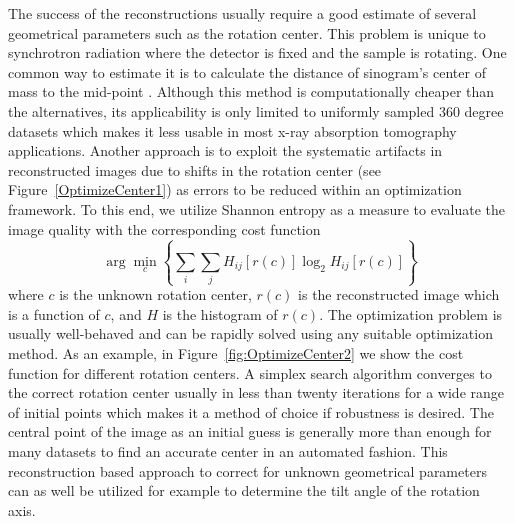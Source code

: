 \documentclass[pdf]{iucr}              %
\begin{document}
The success of the reconstructions usually require a good estimate of several geometrical parameters such as the rotation center. This problem is unique to synchrotron radiation where the detector is fixed and the sample is rotating. One common way to estimate it is to calculate the distance of sinogram's center of mass to the mid-point \cite{Azevedo}. Although this method is computationally cheaper than the alternatives, its applicability is only limited to uniformly sampled 360 degree datasets which makes it less usable in most x-ray absorption tomography applications. Another approach is to exploit the systematic artifacts in reconstructed images due to shifts in the rotation center \cite{donath_spie_2006} (see Figure~\ref{OptimizeCenter1}) as errors to be reduced within an optimization framework. To this end, we utilize Shannon entropy as a measure to evaluate the image quality with the corresponding cost function
\begin{equation}
\arg \min_c \left\{\sum_i \sum_jH_{ij}\left[r(c)\right]\log_2 H_{ij}\left[r(c)\right]\right\}
\end{equation}
where $c$ is the unknown rotation center, $r(c)$ is the reconstructed image which is a function of $c$, and $H$ is the histogram of $r(c)$. The optimization problem is usually well-behaved and can be rapidly solved using any suitable optimization method.  As an example, in Figure~\ref{fig:OptimizeCenter2} we show the cost function for different rotation centers. A simplex search algorithm converges to the correct rotation center usually in less than twenty iterations for a wide range of initial points which makes it a method of choice if robustness is desired. The central point of the image as an initial guess is generally more than enough for many datasets to find an accurate center in an automated fashion. This reconstruction based approach to correct for unknown geometrical parameters can as well be utilized for example to determine the tilt angle of the rotation axis.
\end{document}
